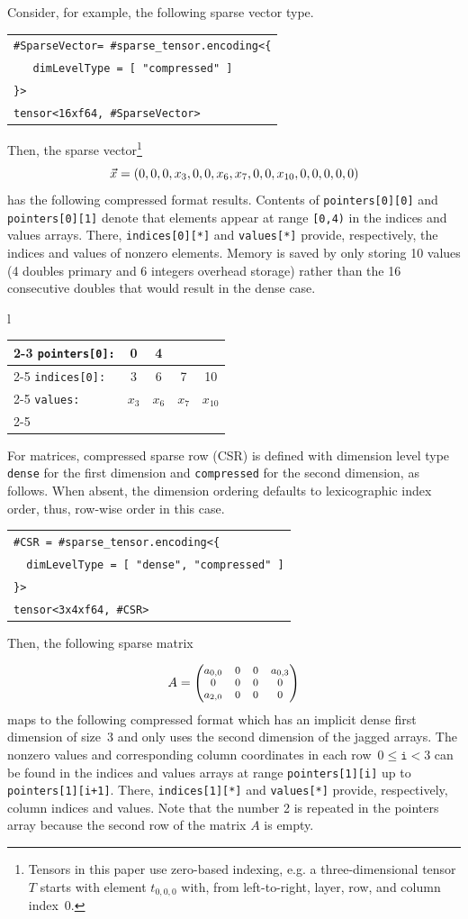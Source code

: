 \documentclass[10pt]{article}
\newcommand{\exam}{\begin{flushleft}\scriptsize\begin{tabular}{l}}
\newcommand{\maxe}{\end{tabular}\end{flushleft}}
\begin{document}
Consider, for example, the following sparse vector type.
\exam
\verb"#SparseVector= #sparse_tensor.encoding<{" \\
\verb+   dimLevelType = [ "compressed" ]+ \\
\verb"}>" \\
\verb"tensor<16xf64, #SparseVector>"
\maxe
Then, the sparse vector\footnote{
Tensors in this paper use zero-based indexing, e.g. a three-dimensional tensor $T$ starts with element $t_{0,0,0}$ with, from left-to-right, layer, row, and column index~0.
}
\[ \footnotesize
\vec{x} = 
 (  0, 0, 0, x_{3}, 0, 0, x_{6}, x_{7}, 0, 0, x_{10}, 0, 0, 0, 0, 0 )
\]
has the following compressed format results. Contents of \texttt{pointers[0][0]} and \texttt{pointers[0][1]} denote that elements appear at range \texttt{[0,4)} in the indices and values arrays. There, \texttt{indices[0][*]} and \texttt{values[*]} provide, respectively, the indices and values of nonzero elements. Memory is saved by only storing 10 values (4 doubles primary and 6 integers overhead storage) rather than the 16 consecutive doubles that would result in the dense case.

\exam
\begin{tabular}{l|c|c|c|c|}
\cline{2-3}
\texttt{pointers[0]:} & 0 & 4 \\
\cline{2-5}
\texttt{indices[0]:}  & 3 & 6 & 7 & 10 \\
\cline{2-5}
\texttt{values:}      & $x_{3}$ & $x_{6}$ & $x_{7}$ & $x_{10}$ \\
\cline{2-5}
\end{tabular}
\maxe

For matrices, compressed sparse row (CSR) is defined with dimension level type \texttt{dense} for the first dimension and \texttt{compressed} for the second dimension, as follows. When absent, the dimension ordering defaults to lexicographic index order, thus, row-wise order in this case.

\exam
\verb"#CSR = #sparse_tensor.encoding<{" \\
\verb+  dimLevelType = [ "dense", "compressed" ]+ \\
\verb"}>" \\
\verb"tensor<3x4xf64, #CSR>" \\
\maxe
Then, the following sparse matrix

\[ \footnotesize
A = \begin{pmatrix}
a_{0,0} & 0 & 0 & a_{0,3} \\
0       & 0 & 0 & 0 \\
a_{2,0} & 0 & 0 & 0 \\
\end{pmatrix}
\]
maps to the following compressed format which has an implicit dense first dimension of size~3 and only uses the second dimension of the jagged arrays. The nonzero values and corresponding column coordinates in each row~$0 \leq \texttt{i} < 3$ can be found in the indices and values arrays at range \texttt{pointers[1][i]} up to \texttt{pointers[1][i+1]}. There, \texttt{indices[1][*]} and \texttt{values[*]} provide, respectively, column indices and values. Note that the number 2 is repeated in the pointers array because the second row of the matrix $A$ is empty.
\end{document}

